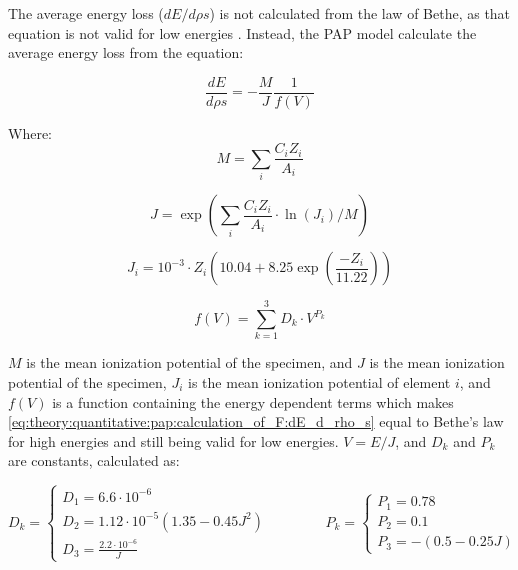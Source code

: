 The average energy loss ($dE/d\rho s$) is not calculated from the law of Bethe, as that equation is not valid for low energies \cite{inokuti_on_bethe_1971,pap_1991}.
Instead, the PAP model calculate the average energy loss from the equation:


\begin{equation}
    \label{eq:theory:quantitative:pap:calculation_of_F:dE_d_rho_s}
    \frac{dE}{d\rho s} = - \frac{M}{J} \frac{1}{f(V)}
\end{equation}

Where:
\begin{equation}
    \label{eq:theory:quantitative:pap:calculation_of_F:dE_d_rho_s:M}
    M = \sum \limits_{i} \frac{C_i Z_i}{A_i}
\end{equation}

\begin{equation}
    \label{eq:theory:quantitative:pap:calculation_of_F:dE_d_rho_s:J}
    J = \exp(\sum \limits_{i} \frac{C_i Z_i}{A_i} \cdot \ln(J_i)/M)
\end{equation}

\begin{equation}
    \label{eq:theory:quantitative:pap:calculation_of_F:dE_d_rho_s:Ji}
    J_i = 10^{-3} \cdot Z_i (10.04 + 8.25 \exp(\frac{-Z_i}{11.22}))
\end{equation}

\begin{equation}
    \label{eq:theory:quantitative:pap:calculation_of_F:dE_d_rho_s:one_over_f}
    f(V) = \sum \limits_{k=1}^{3} D_k \cdot V^{P_k}
\end{equation}

$M$ is the mean ionization potential of the specimen, and $J$ is the mean ionization potential of the specimen, $J_i$ is the mean ionization potential of element $i$, and $f(V)$ is a function containing the energy dependent terms which makes \cref{eq:theory:quantitative:pap:calculation_of_F:dE_d_rho_s} equal to Bethe's law for high energies and still being valid for low energies. $V = E/J$, and $D_k$ and $P_k$ are constants, calculated as:


\begin{equation}
    \label{eq:theory:quantitative:pap:calculation_of_F:dE_d_rho_s:one_over_f:d_k}
    D_k = \begin{cases}
        D_1 = 6.6 \cdot 10^{-6}                                 \\
        D_2 = 1.12 \cdot 10^{-5}(1.35 - 0.45 J^2) \qquad \qquad \\
        D_3 = \frac{2.2 \cdot 10^{-6}}{J}
    \end{cases}
    P_k = \begin{cases}
        P_1 =  0.78 \\
        P_2 = 0.1   \\
        P_3 =  -(0.5-0.25J)
    \end{cases}
\end{equation}

